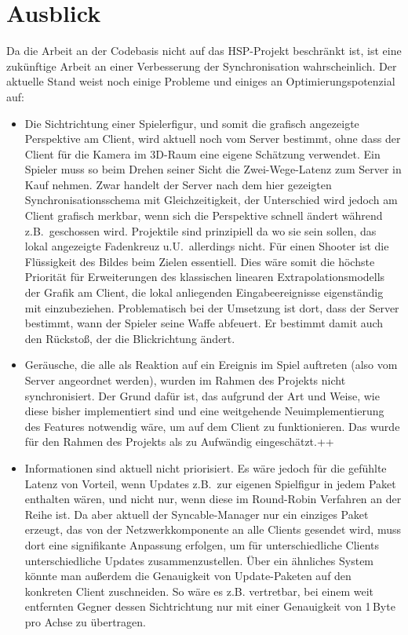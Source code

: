 \section{Ausblick}
Da die Arbeit an der Codebasis nicht auf das HSP-Projekt beschränkt ist, ist eine zukünftige Arbeit an einer Verbesserung der Synchronisation wahrscheinlich. Der aktuelle Stand weist noch einige Probleme und einiges an Optimierungspotenzial auf:
\begin{itemize}
\item Die Sichtrichtung einer Spielerfigur, und somit die grafisch angezeigte Perspektive am Client, wird aktuell noch vom Server bestimmt, ohne dass der Client für die Kamera im 3D-Raum eine eigene Schätzung verwendet. 
Ein Spieler muss so beim Drehen seiner Sicht die Zwei-Wege-Latenz zum Server in Kauf nehmen. Zwar handelt der Server nach dem hier gezeigten Synchronisationsschema mit Gleichzeitigkeit, der Unterschied wird jedoch am Client grafisch merkbar, wenn sich die Perspektive schnell ändert während z.B.~geschossen wird. Projektile sind prinzipiell da wo sie sein sollen, das lokal angezeigte Fadenkreuz u.U.~allerdings nicht. Für einen Shooter ist die Flüssigkeit des Bildes  beim Zielen essentiell.
Dies wäre somit die höchste Priorität für Erweiterungen des klassischen linearen Extrapolationsmodells der Grafik am Client, die lokal anliegenden Eingabeereignisse eigenständig mit einzubeziehen. Problematisch bei der Umsetzung ist dort, dass der Server bestimmt, wann der Spieler seine Waffe abfeuert. Er bestimmt damit auch den Rückstoß, der die Blickrichtung ändert.
\item Geräusche, die alle als Reaktion auf ein Ereignis im Spiel auftreten (also vom Server angeordnet werden), wurden im Rahmen des Projekts nicht synchronisiert. Der Grund dafür ist, das aufgrund der Art und Weise, wie diese bisher implementiert sind und eine weitgehende Neuimplementierung des Features notwendig wäre, um auf dem Client zu funktionieren. Das wurde für den Rahmen des Projekts als zu Aufwändig eingeschätzt.++
\item Informationen sind aktuell nicht priorisiert. Es wäre jedoch für die gefühlte Latenz von Vorteil, wenn Updates z.B.~zur eigenen Spielfigur in jedem Paket enthalten wären, und nicht nur, wenn diese im Round-Robin Verfahren an der Reihe ist. Da aber aktuell der Syncable-Manager nur ein einziges Paket erzeugt, das von der Netzwerkkomponente an alle Clients gesendet wird, muss dort eine signifikante Anpassung erfolgen, um für unterschiedliche Clients unterschiedliche Updates zusammenzustellen. Über ein ähnliches System könnte man außerdem die Genauigkeit von Update-Paketen auf den konkreten Client zuschneiden. So wäre es z.B. vertretbar, bei einem weit entfernten Gegner dessen Sichtrichtung nur mit einer Genauigkeit von 1\,Byte pro Achse zu übertragen.

\end{itemize}
